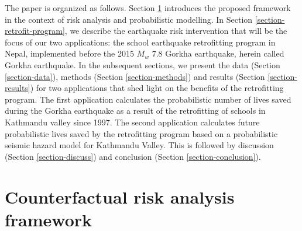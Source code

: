 \documentclass[utf8]{frontiersSCNS} %
\begin{document}
The paper is organized as follows. Section \ref{section-counter} introduces the proposed framework in the context of risk analysis and probabilistic modelling. In Section \ref{section-retrofit-program}, we describe the earthquake risk intervention that will be the focus of our two applications: the school earthquake retrofitting program in Nepal, implemented before the 2015 $M_{w}$ 7.8 Gorkha earthquake, herein called Gorkha earthquake. In the subsequent sections, we present the data (Section \ref{section-data}), methods (Section \ref{section-methods}) and results (Section \ref{section-results}) for two applications that shed light on the benefits of the retrofitting program. The first application calculates the probabilistic number of lives saved during the Gorkha earthquake as a result of the retrofitting of schools in Kathmandu valley since 1997. The second application calculates future probabilistic lives saved by the retrofitting program based on a probabilistic seismic hazard model for Kathmandu Valley. This is followed by discussion (Section \ref{section-discuss}) and conclusion (Section \ref{section-conclusion}).

\section{Counterfactual risk analysis framework}
\label{section-counter}
\end{document}
